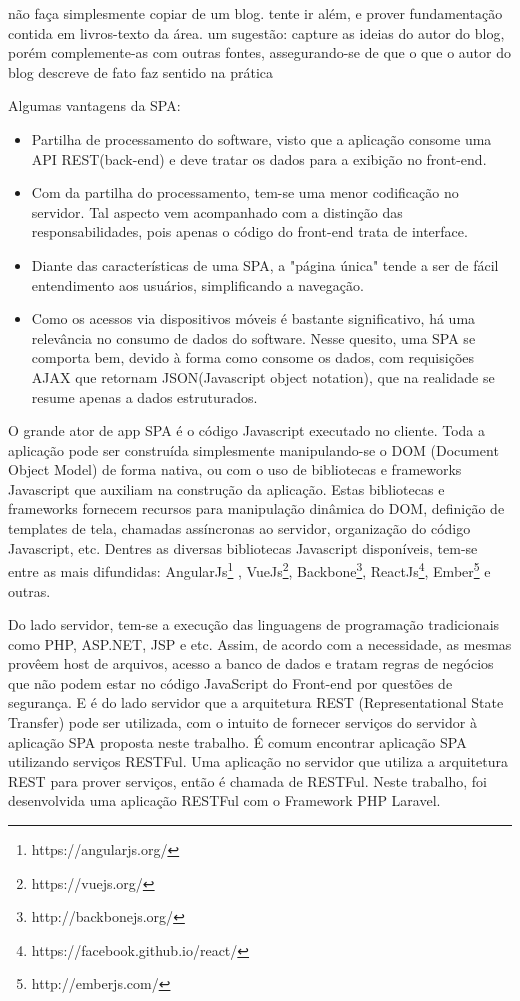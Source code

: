 não faça simplesmente copiar de um blog. tente ir além, e prover fundamentação contida em livros-texto da área.
um sugestão: capture as ideias do autor do blog, porém complemente-as com outras fontes, assegurando-se de que o que o autor do blog descreve de fato faz sentido na prática

Algumas vantagens da SPA:
\begin{itemize}

\item Partilha de processamento do software, visto que a aplicação consome uma API REST(back-end) e deve tratar os dados para a exibição no front-end.
\item Com da partilha do processamento, tem-se uma menor codificação no servidor. Tal aspecto vem acompanhado com a distinção das responsabilidades, pois apenas o código do front-end trata de interface.
\item Diante das características de uma SPA, a "página única" tende a ser de fácil entendimento aos usuários, simplificando a navegação.
\item Como os acessos via dispositivos móveis é bastante significativo, há uma relevância no consumo de dados do software. Nesse quesito, uma SPA se comporta bem, devido à forma como consome os dados, com requisições AJAX que retornam JSON(Javascript object notation), que na realidade se resume apenas a dados estruturados.

\end{itemize}
O grande ator de app SPA é o código Javascript executado no cliente. Toda a aplicação pode ser construída simplesmente manipulando-se o DOM (Document Object Model) de forma nativa, ou com o uso de bibliotecas e frameworks Javascript que auxiliam na construção da aplicação. Estas bibliotecas e frameworks fornecem recursos para manipulação dinâmica do DOM, definição de templates de tela, chamadas assíncronas ao servidor, organização do código Javascript, etc. Dentres as diversas bibliotecas Javascript disponíveis, tem-se entre as mais difundidas: AngularJs\footnote{https://angularjs.org/}
, VueJs\footnote{https://vuejs.org/}, Backbone\footnote{http://backbonejs.org/}, ReactJs\footnote{https://facebook.github.io/react/}, Ember\footnote{http://emberjs.com/} e outras.


Do lado servidor, tem-se a execução das linguagens de programação tradicionais como PHP, ASP.NET, JSP e etc. Assim, de acordo com a necessidade, as mesmas provêem host de arquivos, acesso a banco de dados e tratam regras de negócios que não podem estar no código JavaScript do Front-end por questões de segurança. E é do lado servidor que a arquitetura REST (Representational State Transfer) pode ser utilizada, com o intuito de fornecer serviços do servidor à aplicação SPA proposta neste trabalho. É comum encontrar aplicação SPA utilizando serviços RESTFul. Uma aplicação no servidor que utiliza a arquitetura REST para prover serviços, então é chamada de RESTFul. Neste trabalho, foi desenvolvida uma aplicação RESTFul com o Framework PHP Laravel.


